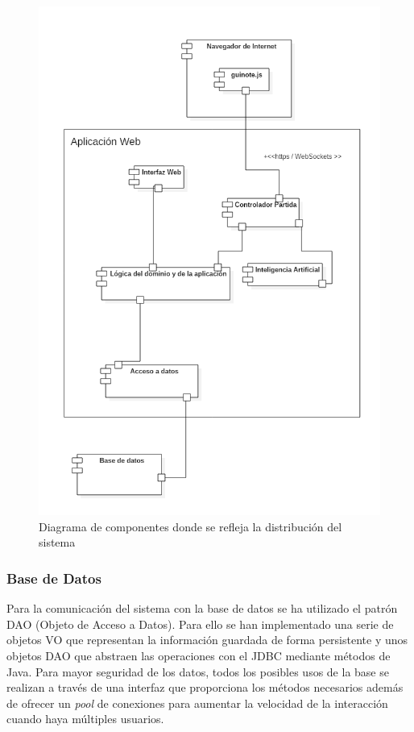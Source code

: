 \begin{figure}[H]
\centering
\includegraphics[scale = 0.5]{figuras/componentes.png}
\caption{Diagrama de componentes donde se refleja la distribución del sistema}
\label{fig:diagramaComponentes}
\end{figure}

\subsubsection{Base de Datos}

Para la comunicación del sistema con la base de datos se ha utilizado el patrón DAO (Objeto de Acceso a Datos). Para ello se han implementado una serie de objetos VO que representan la información guardada de forma persistente y unos objetos DAO que abstraen las operaciones con el JDBC mediante métodos de Java. Para mayor seguridad de los datos, todos los posibles usos de la base se realizan a través de una interfaz que proporciona los métodos necesarios además de ofrecer un \textit{pool} de conexiones para aumentar la velocidad de la interacción cuando haya múltiples usuarios.\\

